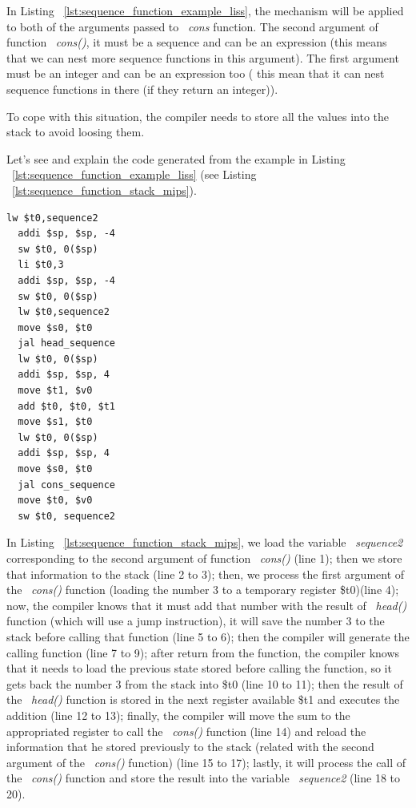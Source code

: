 \documentclass[
  oneside,
  11pt, a4paper,
  footinclude=true,
  headinclude=true,
  cleardoublepage=empty
]{scrbook}
\begin{document}
In Listing ~\ref{lst:sequence_function_example_liss}, the mechanism will be applied to both of the arguments passed to ~\textit{cons} function. The second argument of function ~\textit{cons()}, it must be a sequence and can be an expression (this means that we can nest more sequence functions in this argument). The first argument must be an integer and can be an expression too ( this mean that it can nest sequence functions in there (if they return an integer)).

To cope with this situation, the compiler needs to store all the values into the stack to avoid loosing them.

Let's see and explain the code generated from the example in Listing ~\ref{lst:sequence_function_example_liss} (see Listing ~\ref{lst:sequence_function_stack_mips}).

\begin{lstlisting}[caption={Example of code generated for Listing ~\ref{lst:sequence_function_example_liss}},label={lst:sequence_function_stack_mips}]
  lw $t0,sequence2		
  addi $sp, $sp, -4
  sw $t0, 0($sp)
  li $t0,3		
  addi $sp, $sp, -4
  sw $t0, 0($sp)
  lw $t0,sequence2		
  move $s0, $t0		
  jal head_sequence
  lw $t0, 0($sp)
  addi $sp, $sp, 4
  move $t1, $v0		
  add $t0, $t0, $t1	
  move $s1, $t0		
  lw $t0, 0($sp)
  addi $sp, $sp, 4
  move $s0, $t0		
  jal cons_sequence
  move $t0, $v0		
  sw $t0, sequence2		
\end{lstlisting}

In Listing ~\ref{lst:sequence_function_stack_mips}, we load the variable ~\textit{sequence2} corresponding to the second argument of function ~\textit{cons()} (line 1); then we store that information to the stack (line 2 to 3); then, we process the first argument of the ~\textit{cons()} function (loading the number 3 to a temporary register \$t0)(line 4); now, the compiler knows that it must add that number with the result of ~\textit{head()} function (which will use a jump instruction), it will save the number 3 to the stack before calling that function (line 5 to 6); then the compiler will generate the calling function (line 7 to 9); after return from the function, the compiler knows that it needs to load the previous state stored before calling the function, so it gets back the number 3 from the stack into \$t0 (line 10 to 11); then the result of the ~\textit{head()} function is stored in the next register available \$t1 and executes the addition (line 12 to 13);
finally, the compiler will move the sum to the appropriated register to call the ~\textit{cons()} function (line 14) and reload the information that he stored previously to the stack (related with the second argument of the ~\textit{cons()} function) (line 15 to 17); lastly, it will process the call of the ~\textit{cons()} function and store the result into the variable ~\textit{sequence2} (line 18 to 20).
\end{document}
